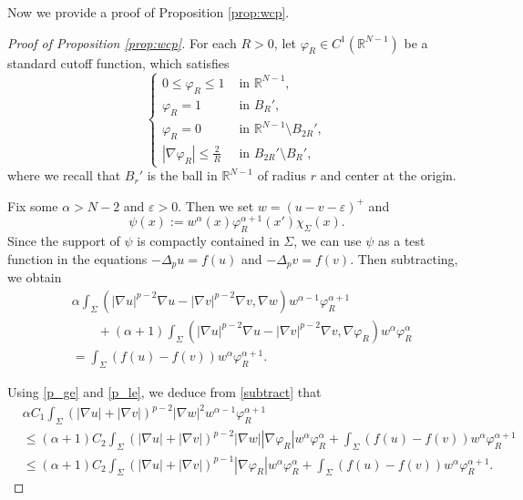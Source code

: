 \documentclass[reqno]{amsart}
\theoremstyle{plain}
\theoremstyle{definition}
\theoremstyle{remark}
\begin{document}
	Now we provide a proof of Proposition \ref{prop:wcp}.
	
	\begin{proof}[Proof of Proposition \ref{prop:wcp}]
		For each $R>0$, let $\varphi_R \in C^1(\mathbb{R}^{N-1})$ be a standard cutoff function, which satisfies
		\begin{equation}\label{phi}
			\begin{cases}
				0 \le \varphi_R \le 1 &\text{ in } \mathbb{R}^{N-1},\\
				\varphi_R = 1 &\text{ in } B_R',\\
				\varphi_R = 0 &\text{ in } \mathbb{R}^{N-1} \setminus B_{2R}',\\
				|\nabla\varphi_R| \le \frac{2}{R} &\text{ in } B_{2R}' \setminus B_R',
			\end{cases}
		\end{equation}
		where we recall that $B_r'$ is the ball in $\mathbb{R}^{N-1}$ of radius $r$ and center at the origin.
		
		Fix some $\alpha>N-2$ and $\varepsilon>0$. Then we set $w=(u-v-\varepsilon)^+$ and
		\[
		\psi(x) := w^{\alpha}(x) \varphi_R^{\alpha+1}(x') \chi_{\Sigma}(x).
		\]
		Since the support of $\psi$ is compactly contained in $\Sigma$, we can use $\psi$ as a test function in the equations $-\Delta_p u = f(u)$ and $-\Delta_p v = f(v)$. Then subtracting, we obtain
		\begin{equation}\label{subtract}
			\begin{aligned}
				&\alpha \int_{\Sigma} (|\nabla u|^{p-2}\nabla u - |\nabla v|^{p-2}\nabla v, \nabla w) w^{\alpha-1} \varphi_R^{\alpha+1} \\
				&\qquad+ (\alpha+1) \int_{\Sigma} (|\nabla u|^{p-2}\nabla u - |\nabla v|^{p-2}\nabla v, \nabla \varphi_R) w^{\alpha} \varphi_R^\alpha\\
				&= \int_{\Sigma} \left(f(u) - f(v)\right) w^{\alpha} \varphi_R^{\alpha+1}.
			\end{aligned}
		\end{equation}
		
		Using \eqref{p_ge} and \eqref{p_le}, we deduce from \eqref{subtract} that
		\begin{equation}\label{t0}
			\begin{aligned}
				&\alpha C_1 \int_{\Sigma} (|\nabla u| + |\nabla v|)^{p-2} |\nabla w|^2 w^{\alpha-1} \varphi_R^{\alpha+1}\\
				&\le (\alpha+1)C_2 \int_{\Sigma} (|\nabla u| + |\nabla v|)^{p-2} |\nabla w| |\nabla \varphi_R| w^{\alpha} \varphi_R^\alpha + \int_{\Sigma} \left(f(u) - f(v)\right) w^{\alpha} \varphi_R^{\alpha+1}\\
				&\le (\alpha+1)C_2 \int_{\Sigma} (|\nabla u| + |\nabla v|)^{p-1} |\nabla \varphi_R| w^{\alpha} \varphi_R^\alpha + \int_{\Sigma} \left(f(u) - f(v)\right) w^{\alpha} \varphi_R^{\alpha+1}.
			\end{aligned}
		\end{equation}
		

\end{proof}
\end{document}
